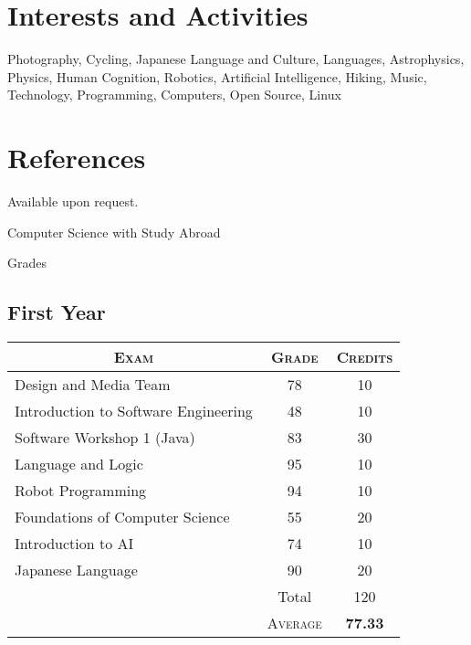 \documentclass[a4paper,10pt]{article}
\begin{document}
\section{Interests and Activities}
Photography, Cycling, Japanese Language and Culture, Languages,
Astrophysics, Physics, Human Cognition, Robotics, Artificial
Intelligence, Hiking, Music, Technology, Programming, Computers, Open
Source, Linux
\section{References}
Available upon request.

\newpage
\par{\centering\Large \hypertarget{bham_ug}{Computer Science with
    Study Abroad}\par}\large{\centering Grades\par}\normalsize
\begin{center}
  \section{First Year}
  \begin{tabular}{lcc}
    \multicolumn{1}{c}{\textsc{Exam}}&\textsc{Grade}&\textsc{Credits}\\ \hline
    Design and Media Team&78&	10\\
    Introduction to Software Engineering	&48&	10\\
    Software Workshop 1 (Java)	&83&	30\\
    Language and Logic	&95&	10\\
    Robot Programming	&94&	10\\
    Foundations of Computer Science	&55	&20\\
    Introduction to AI	&74&	10\\
    Japanese Language	&90&	20\\\cline{2-3}
    & Total&120\\
    &\textsc{Average}&\textbf{77.33}
  \end{tabular}
\end{center}
\end{document}
